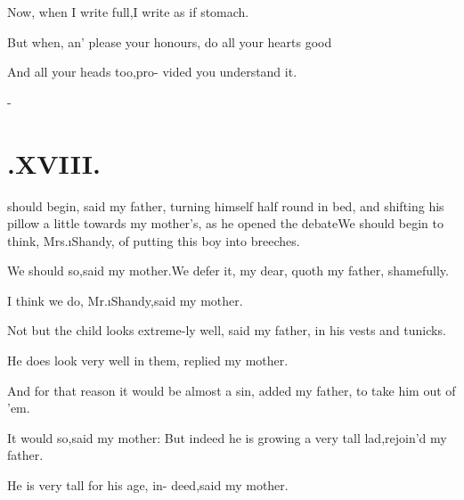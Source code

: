 \documentclass[twoside]{article}
\begin{document}
Now, when I write full,\tsk I write as if\break
{}
stomach.\tsh

But when, an’ please your honours,\break 
{}
do all your hearts good\tsh

\tsh And all your heads too,\tsk pro-\break
vided you understand it.

\null\kern-\baselineskip
\section{.\enspace XVIII.}

 should begin, said my father,
turning himself half round in bed, and shifting his pillow a little
towards my mother’s, as he opened the debate\tsh We
should begin to think, Mrs.\@ \i{Shandy}, of putting this boy into
breeches.\tsh

We should so,\tsk said my mother.\tsh We defer it, my
dear, quoth my father, shamefully.\tsh

I think we do, Mr.\@ \i{Shandy},\tsk said my mother.

\tsh Not but the child looks extreme-\break ly well, said my
father, in his vests and tunicks.\tsh{}

\tsh He does look very well in them,\break
\tsk replied my mother.\tsh

\tsh And for that reason it would be\break
almost a sin, added my father, to take\break
him out of ’em.\tsh

\tsh It would so,\tsk said my mother:\break
\tsh But indeed he is growing a very\break
tall lad,\tsk rejoin’d my father.

\tsh He is very tall for his age, in-\break 
deed,\tsk said my mother.\tsh
\end{document}

